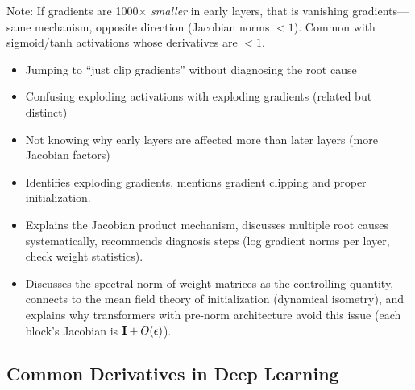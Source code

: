 \begin{interviewq}
Note: If gradients are 1000$\times$ \textit{smaller} in early layers, that is vanishing gradients---same mechanism, opposite direction (Jacobian norms $< 1$). Common with sigmoid/tanh activations whose derivatives are $< 1$.

\redflags
\begin{itemize}
    \item Jumping to ``just clip gradients'' without diagnosing the root cause
    \item Confusing exploding activations with exploding gradients (related but distinct)
    \item Not knowing why early layers are affected more than later layers (more Jacobian factors)
\end{itemize}


\goodgreat
\begin{itemize}
    \item {} Identifies exploding gradients, mentions gradient clipping and proper initialization.
    \item {} Explains the Jacobian product mechanism, discusses multiple root causes systematically, recommends diagnosis steps (log gradient norms per layer, check weight statistics).
    \item {} Discusses the spectral norm of weight matrices as the controlling quantity, connects to the mean field theory of initialization (dynamical isometry), and explains why transformers with pre-norm architecture avoid this issue (each block's Jacobian is $\mathbf{I} + O(\epsilon)$).
\end{itemize}

\end{interviewq}

\subsection{Common Derivatives in Deep Learning}

